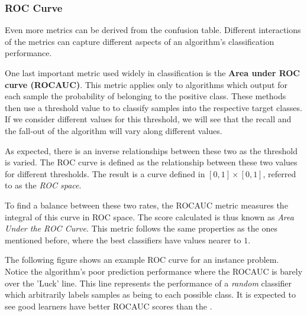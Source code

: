 \subsubsection{ROC Curve}

Even more metrics can be derived from the confusion table. Different interactions of the metrics can capture different aspects of an algorithm's classification performance. 

One last important metric used widely in classification is the  \textbf{Area under ROC curve (ROCAUC)}. This metric applies only to algorithms which output for each sample  the probability of belonging to the positive class.  These methods then use a threshold value to to classify samples into the respective target classes. If we consider different values for this threshold, we will see that the recall and the fall-out of the algorithm will vary along different values. 

As expected, there is an inverse relationships between these two as the threshold is varied. The ROC curve is defined as the relationship between these two values for different thresholds. The result is a curve defined in $[0,1]\times[0,1]$, referred to as the \textit{ROC space}.

To find a balance between these two rates, the ROCAUC metric measures the integral of this curve in ROC space. The score  calculated is thus known as \textit{Area Under the ROC Curve}. This metric follows the same properties as the ones mentioned before, where the best classifiers have values nearer to $1$. 

The following figure shows an example ROC curve for an instance problem. Notice the algorithm's poor prediction performance where the ROCAUC is barely over the 'Luck' line. This line represents the performance of a \textit{random} classifier which arbitrarily labels samples as being to each possible class. It is expected to see good learners have better ROCAUC scores than the . 